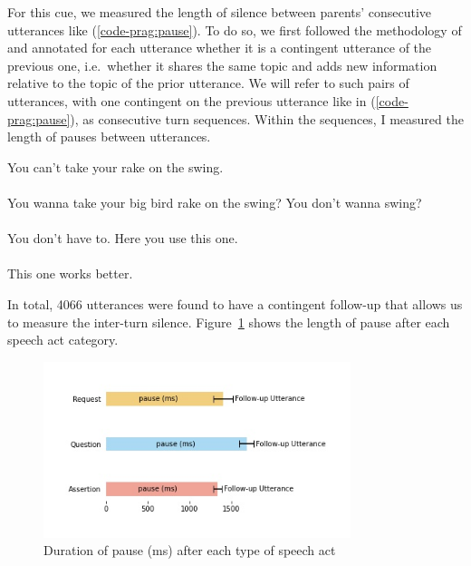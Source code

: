 For this cue, we measured the length of silence between parents’ consecutive utterances like (\ref{code-prag:pause}). To do so, we first followed the methodology of \textcite{bloom1976discourse} and annotated for each utterance whether it is a contingent utterance of the previous one, i.e.\ whether it shares the same topic and adds new information relative to the topic of the prior utterance. We will refer to such pairs of utterances, with one contingent on the previous utterance like in (\ref{code-prag:pause}), as consecutive turn sequences. Within the sequences, I measured the length of pauses between utterances. 


\bxl
You can’t take your rake on the swing.\\
  \\ 
 You wanna take your big bird rake on the swing? 			\hfill {}
\ex You don't wanna swing?\\
  \\	
 You don’t have to.	\hfill {}
\ex Here you use this one. \\
  \\ This one works better.	\hfill {}
\exl
\eex

In total, 4066 utterances were found to have a contingent follow-up that allows us to measure the inter-turn silence. Figure~\ref{fig:engsp:pause} shows the length of pause after each speech act category.

\begin{figure}[H]
\begin{center}
\includegraphics[width = 0.8\textwidth]{figures/pause.jpg}
	\caption{Duration of pause (ms) after each type of speech act}\label{fig:engsp:pause}
\end{center}
\end{figure}

